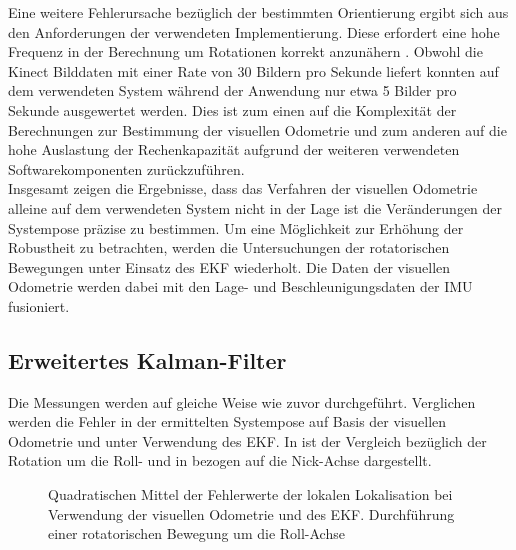 Eine weitere Fehlerursache bezüglich der bestimmten Orientierung ergibt sich aus den Anforderungen der verwendeten Implementierung. Diese erfordert eine hohe Frequenz in der Berechnung um Rotationen korrekt anzunähern \cite{Fovis}. Obwohl die Kinect Bilddaten mit einer Rate von \SI{30}{} Bildern pro Sekunde liefert konnten auf dem verwendeten System während der Anwendung nur etwa \SI{5}{} Bilder pro Sekunde ausgewertet werden. Dies ist zum einen auf die Komplexität der Berechnungen zur Bestimmung der visuellen Odometrie und zum anderen auf die hohe Auslastung der Rechenkapazität aufgrund der weiteren verwendeten Softwarekomponenten zurückzuführen.\\ 

Insgesamt zeigen die Ergebnisse, dass das Verfahren der visuellen Odometrie alleine auf dem verwendeten System nicht in der Lage ist die Veränderungen der Systempose präzise zu bestimmen. Um eine Möglichkeit zur Erhöhung der Robustheit zu betrachten, werden die Untersuchungen der rotatorischen Bewegungen unter Einsatz des EKF wiederholt. Die Daten der visuellen Odometrie werden dabei mit den Lage- und Beschleunigungsdaten der IMU fusioniert.\\

\subsection{Erweitertes Kalman-Filter}
Die Messungen werden auf gleiche Weise wie zuvor durchgeführt. Verglichen werden die Fehler in der ermittelten Systempose auf Basis der visuellen Odometrie und unter Verwendung des EKF. In  ist der Vergleich bezüglich der Rotation um die Roll- und in  bezogen auf die Nick-Achse dargestellt.\\


\begin{figure}

\caption{Quadratischen Mittel der Fehlerwerte der lokalen Lokalisation bei Verwendung der visuellen Odometrie und des EKF. Durchführung einer rotatorischen Bewegung um die Roll-Achse}
\label{fig.loc_loc_rot_ekf_roll}
\end{figure}

